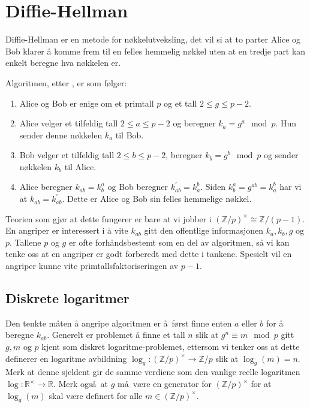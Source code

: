 \section{Diffie-Hellman}

Diffie-Hellman er en metode for nøkkelutveksling,
det vil si at to parter Alice og Bob klarer å komme
frem til en felles hemmelig nøkkel uten at en tredje part
kan enkelt beregne hva nøkkelen er.

Algoritmen, etter \cite{diffie_new_1976}, er som følger:
\begin{enumerate}
    \item Alice og Bob er enige om et primtall $p$
        og et tall $2 \leq g \leq p - 2$.
    \item Alice velger et tilfeldig tall $2 \leq a \leq p - 2$
        og beregner $k_a = g^a \mod p$.
        Hun sender denne nøkkelen $k_a$ til Bob.
    \item Bob velger et tilfeldig tall $2 \leq b \leq p - 2$,
        beregner $k_b = g^b\mod p$
        og sender nøkkelen $k_b$ til Alice.
    \item Alice beregner $k_{ab} = k_b^a$
        og Bob beregner $k_{ab}^\prime = k_a^b$.
        Siden $k_b^a = g^{ab} = k_a^b$ har vi
        at $k_{ab} = k_{ab}^\prime$.
        Dette er Alice og Bob sin felles hemmelige nøkkel.
\end{enumerate}

Teorien som gjør at dette fungerer er bare at vi jobber i
${(\mathbb Z / p)}^\times\cong\mathbb Z / (p - 1)$.
En angriper er interessert i å vite $k_{ab}$ gitt den offentlige informasjonen
$k_a, k_b, g$ og $p$.
Tallene $p$ og $g$ er ofte forhåndsbestemt som en del av algoritmen,
så vi kan tenke oss at en angriper er godt forberedt med dette i tankene.
Spesielt vil en angriper kunne vite primtallsfaktoriseringen av $p - 1$.

\subsection{Diskrete logaritmer}\label{sec:discrete-logarithms}

Den tenkte måten å angripe algoritmen er å først finne enten $a$ eller $b$
for å beregne $k_{ab}$.
Generelt er problemet å finne et tall $n$ slik at $g^n \equiv m\mod p$ gitt
$g, m$ og $p$ kjent som diskret logaritme-problemet,
ettersom vi tenker oss at dette definerer en logaritme avbildning
$\log_g\colon{(\mathbb Z / p)}^\times\to \mathbb Z / p$
slik at $\log_g(m) = n$.
Merk at denne sjeldent gir de samme verdiene som den vanlige reelle logaritmen
$\log\colon \mathbb R^\times\to \mathbb R$.
Merk også at $g$ må være en generator for ${(\mathbb Z / p)}^\times$
for at $\log_g(m)$ skal være definert for alle $m\in{(\mathbb Z / p)}^\times$.

